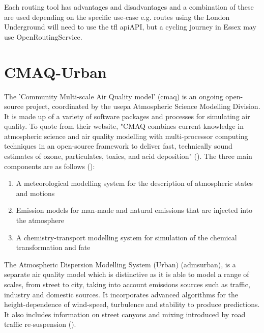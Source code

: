 Each routing tool has advantages and disadvantages and a combination of these are used depending on the specific use-case e.g. routes using the London Underground will need to use the \gls{tfl} \gls{api}API, but a cycling journey in Essex may use OpenRoutingService.


\section{CMAQ-Urban}
\label{sec:cmaq_urban}

The 'Community Multi-scale Air Quality model' (\gls{cmaq}) is an ongoing open-source project, coordinated by the \gls{usepa} Atmospheric Science Modelling Division. It is made up of a variety of software packages and processes for simulating air quality. To quote from their website, "CMAQ combines current knowledge in atmospheric science and air quality modelling with multi-processor computing techniques in an open-source framework to deliver fast, technically sound estimates of ozone, particulates, toxics, and acid deposition" (\cite{UnitedStatesEnvironmentalProtectionAgency2014}). The three main components are as follows (\cite{CMASCentre}):

\begin{enumerate}
\item A meteorological modelling system for the description of atmospheric states and motions
\item Emission models for man-made and natural emissions that are injected into the atmosphere
\item A chemistry-transport modelling system for simulation of the chemical transformation and fate
\end{enumerate}

The Atmospheric Dispersion Modelling System (Urban) (\gls{admsurban}), is a separate air quality model which is distinctive as it is able to model a range of scales, from street to city, taking into account emissions sources such as traffic, industry and domestic sources. It incorporates advanced algorithms for the height-dependence of wind-speed, turbulence and stability to produce predictions. It also includes information on street canyons and mixing introduced by road traffic re-suspension  (\cite{CambridgeEnvironmentalResearchCounsultantsCERC2014a}).

